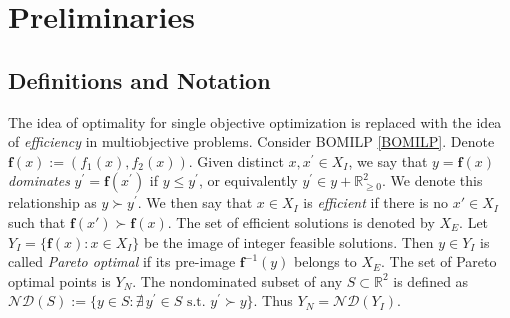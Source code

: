 \documentclass[11.5pt]{article}
\newcommand{\R}{\mathbb{R}}
\newcommand{\xbar}{\overline{x}}
\newcommand{\ybar}{\overline{y}}
\newcommand{\xp}{x^{\prime}}
\newcommand{\yp}{y^{\prime}}
\newcommand{\dom}{\succ}
\newcommand{\objf}{\boldsymbol{f}}
\newcommand{\nonneg}{\R^{2}_{\ge 0}}
\newcommand{\nd}[1]{\mathcal{ND}(#1)}
\begin{document}
\section{Preliminaries}\label{sec:prelim}

\subsection{Definitions and Notation}\label{sec:defn}
The idea of optimality for single objective optimization is replaced with the idea of \emph{efficiency} in multiobjective problems. Consider BOMILP \eqref{BOMILP}. Denote $\objf(x) := (f_{1}(x),f_{2}(x))$. Given distinct $x,x^{\prime} \in X_I$, we say that $y=\objf(x)$ \emph{dominates} $y^{\prime} = \objf(x^{\prime})$ if $y \le y^{\prime}$, or equivalently $y^{\prime}\in y + \nonneg$. We denote this relationship as $y \dom y^{\prime}$. 
We then say that $x\in X_I$ is \emph{efficient} if there is no $x' \in X_I$ such that $\objf(x') \dom \objf(x)$. The set of efficient solutions is denoted by $X_E$. Let $Y_I = \{\objf(x) \colon x\in X_I\}$ be the image of integer feasible solutions. Then $y \in Y_I$ is called \emph{Pareto optimal} if its pre-image $\objf^{-1}(y)$ belongs to $X_{E}$. The set of Pareto optimal points is $Y_{N}$. The nondominated subset of any $S\subset\R^{2}$ is defined as $\nd{S} := \{y\in S\colon \nexists\, y^{\prime}\in S \text{ s.t. } y^{\prime}\dom y \}$. Thus $Y_{N} = \nd{Y_{I}}$.
\end{document}
